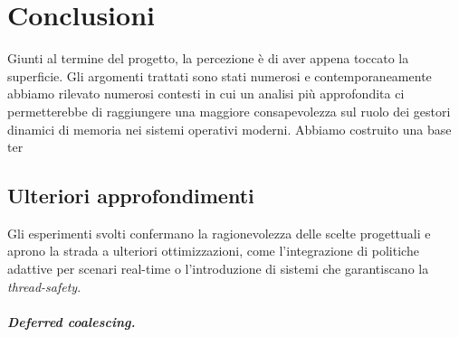 \chapter{Conclusioni}

Giunti al termine del progetto, la percezione è di aver appena toccato la superficie. Gli argomenti trattati sono stati numerosi e contemporaneamente abbiamo rilevato numerosi contesti in cui un analisi più approfondita ci permetterebbe di raggiungere una maggiore consapevolezza sul ruolo dei gestori dinamici di memoria nei sistemi operativi moderni. Abbiamo costruito una base ter

\section{Ulteriori approfondimenti}

Gli esperimenti svolti confermano la ragionevolezza delle scelte progettuali e aprono la strada a ulteriori ottimizzazioni, come l’integrazione di politiche adattive per scenari real-time o l'introduzione di sistemi che garantiscano la \textit{thread-safety}.

\paragraph{Deferred coalescing.}